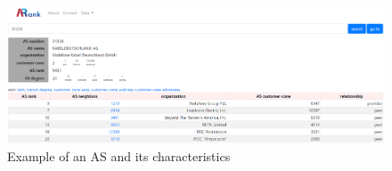 \documentclass[conference, 11pt]{IEEEtran}
\begin{document}
\vspace{0.5cm}
\begin{figure}[htbp]
\centerline{\includegraphics[scale=0.21]{Graphics/asExample.PNG}}
\caption{Example of an AS and its characteristics}
\label{fig}
\end{figure}
\vspace{0.5cm}
\end{document}
